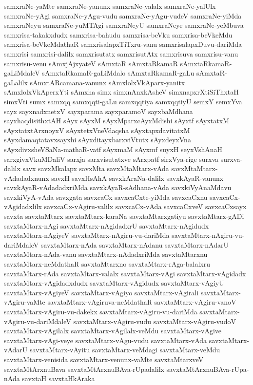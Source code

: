 {samxraNe-yaMte
samxraNe-yanunx
samxraNe-yalalx
samxraNe-yalUlx
samxraNe-yAgi
samxraNe-yAgu-vudu
samxraNe-yAgu-vudeV
samxraNe-yiMda
samxraNeyu
samxraNe-yuMTAgi
samxraNeyU
samxraNeye
samxraNe-yeMbuva
samxrisa-takakxdudx
samxrisa-bahudu
samxrisa-beVku
samxrisa-beVkeMdu
samxrisa-beVkeMdathaR
samxrisalapxTiTxru-vanu
samxrisalapxDuvu-dariMda
samxrisi
samxrisi-dalilx
samxrisutatx
samxrisutAtx
samxrisuva
samxrisu-vanu
samxrisu-venu
sAmxjAjxyateV
sAmxtaR
sAmxtaRkamaR
sAmxtaRkamaR-gaLiMdaleV
sAmxtaRkamaR-gaLiMdalo
sAmxtaRkamaR-gaLu
sAmxtaR-gaLalilx
sAmxtARcamana-vanunx
sAmxlolxVkAparx-yanitx
sAmxlolxVkAperxYti
sAmxha
simx
simxnAnxkAsheV
simxnapxrXtiSiThxtaH
simxVti
sumx
samxqq
samxqqti-gaLu
samxqqtiya
samxqqtiyU
semxY
semxYva
sayx
sayxnadxnetxV
sayxparama
sayxparamoV
sayxbaMdhana
sayxhaqdisithxtAH
sAyx
sAyxM
sAyxMparxcAyxMdishi
sAyxtf
sAyxtatxM
sAyxtatxtArxnoyxV
sAyxtetxVneVdaqsha
sAyxtapxdavitatxM
sAyxdamaqtatavxsayxhi
sAyxditayxbarxviVtutx
sAyxdeyxVna
sAyxdivxsheVSaNa-mathaR-vatf
sAyxmaM
sAyxmf
suyxH
seyxVshAnaH
sarxgivxVkuMDaliV
sarxja
sarxvisutatxve
sArxpatf
sirxVya-rige
surxva
surxva-dalilx
savx
savxMkalapx
savxMta
savxMtaMtarx-vAda
savxMtaMtarx-vAdadadxnunx
savxH
savxHsAhA
savxkAraNa-dalilx
savxkAyaR-vanunx
savxkAyaR-vAdadadxriMda
savxkAyaR-sAdhana-vAda
savxkiVyAnaMdavu
savxkiVyA-vAda
savxgata
savxcaCx
savxcaCxte-yiMda
savxcaCxnu
savxcaCx-vAgidadxlilx
savxcaCx-vAgiru-valilx
savxcaCx-vAda
savxcaCxveV
savxcaCxsayx
savxta
savxtaMtarx
savxtaMtarx-karaNa
savxtaMtarxgatiyu
savxtaMtarx-gADi
savxtaMtarx-nAgi
savxtaMtarx-nAgidadxrU
savxtaMtarx-nAgidudx
savxtaMtarx-nAgiyeV
savxtaMtarx-nAgiru-vu-dariMda
savxtaMtarx-nAgiru-vu-dariMdaleV
savxtaMtarx-nAda
savxtaMtarx-nAdanu
savxtaMtarx-nAdarU
savxtaMtarx-nAda-vanu
savxtaMtarx-nAdadxriMda
savxtaMtarxnu
savxtaMtarx-neMdathaR
savxtaMtarxno
savxtaMtarx-rAga-balalxru
savxtaMtarx-rAda
savxtaMtarx-valalx
savxtaMtarx-vAgi
savxtaMtarx-vAgidadx
savxtaMtarx-vAgidadxdudx
savxtaMtarx-vAgidudx
savxtaMtarx-vAgiyU
savxtaMtarx-vAgiyeV
savxtaMtarx-vAgiyo
savxtaMtarx-vAgirali
savxtaMtarx-vAgiru-vaMte
savxtaMtarx-vAgiruva-neMdathaR
savxtaMtarx-vAgiru-vanoV
savxtaMtarx-vAgiru-vu-dakekx
savxtaMtarx-vAgiru-vu-dariMda
savxtaMtarx-vAgiru-vu-dariMdaleV
savxtaMtarx-vAgiru-vudu
savxtaMtarx-vAgiru-vudoV
savxtaMtarx-vAgilalx
savxtaMtarx-vAgilalx-veMdu
savxtaMtarx-vAgive
savxtaMtarx-vAgi-veye
savxtaMtarx-vAgu-vudu
savxtaMtarx-vAda
savxtaMtarx-vAdarU
savxtaMtarx-vAyitu
savxtaMtarx-veMdagi
savxtaMtarx-veMdu
savxtaMtarx-venisida
savxtaMtarx-venunx-vaMte
savxtaMtarxveV
savxtaMtArxnuBava
savxtaMtArxnuBAva-rUpadalilx
savxtaMtArxnuBAva-rUpa-nAda
savxtaH
savxtaHkAraka
}
